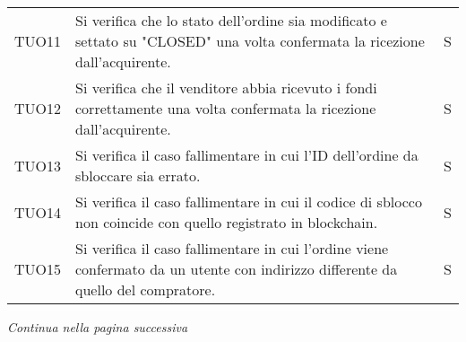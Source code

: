 \begin{table}[H]
\begin{tabular}{c|p{10cm}|c}
    TUO11 & Si verifica che lo stato dell'ordine sia modificato e settato su "CLOSED" una volta confermata la ricezione dall'acquirente.      & S \\
    TUO12 & Si verifica che il venditore abbia ricevuto i fondi correttamente una volta confermata la ricezione dall'acquirente.              & S \\
    TUO13 & Si verifica il caso fallimentare in cui l'ID dell'ordine da sbloccare sia errato.                                                 & S \\
    TUO14 & Si verifica il caso fallimentare in cui il codice di sblocco non coincide con quello registrato in blockchain\glo{}.              & S \\
    TUO15 & Si verifica il caso fallimentare in cui l'ordine viene confermato da un utente con indirizzo differente da quello del compratore. & S \\
  \end{tabular}
\end{table}
\begin{center}
  \textit{\small Continua nella pagina successiva}
\end{center}

